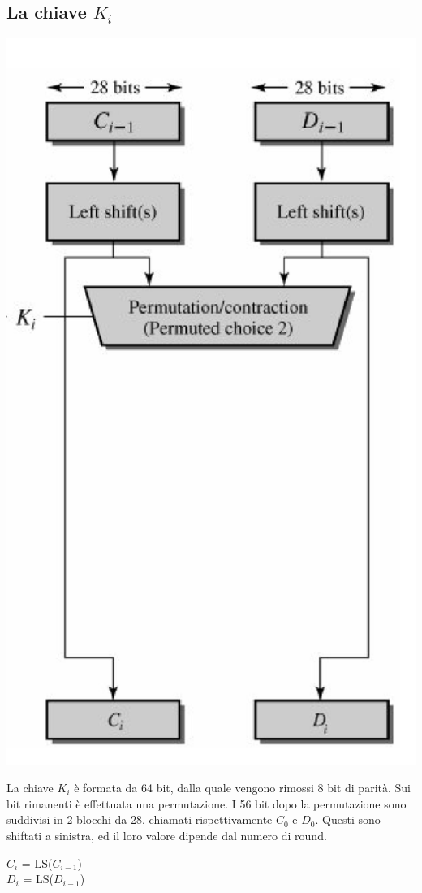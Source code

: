 \documentclass[11pt, oneside]{article}   	%
\begin{document}
\subsection*{La chiave $K_i$}
\begin{center}
\includegraphics[scale= 0.6]{k1}
\end{center}
La chiave $K_i$ è formata da 64 bit, dalla quale vengono rimossi 8 bit di parità. Sui bit rimanenti è effettuata una permutazione. I 56 bit dopo la permutazione sono suddivisi in 2 blocchi da 28, chiamati rispettivamente $C_0$ e $D_0$. Questi sono shiftati a sinistra, ed il loro valore dipende dal numero di round.\begin{center}
$C_i$ = LS($C_{i-1}$)\\
$D_i$ = LS($D_{i-1}$)
\end{center}
\end{document}
